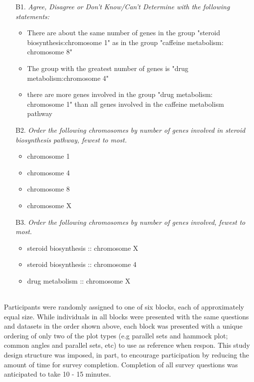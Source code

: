 \begin{itemize}
\item[B1.]\emph{Agree, Disagree or Don't Know/Can't Determine with the following statements:}
\begin{itemize}
\item There are about the same number of genes in the group "steroid biosynthesis:chromosome 1" as in the group "caffeine metabolism: chromosome 8"
\item The group with the greatest number of genes is "drug metabolism:chromosome 4"
\item there are more genes involved in the group "drug metabolism: chromosome 1" than all genes involved in the caffeine metabolism pathway
\end{itemize}

\item[B2.]\emph{Order the following chromosomes by number of genes involved in steroid biosynthesis pathway, fewest to most.}
\begin{itemize}
\item chromosome 1
\item chromosome 4
\item chromosome 8 
\item chromosome X
\end{itemize}

\item[B3.]\emph{Order the following chromosomes by number of genes involved, fewest to most.}
\begin{itemize}
\item steroid biosynthesis :: chromosome X
\item steroid biosynthesis :: chromosome 4
\item drug metabolism :: chromosome X
\end{itemize} 
\end{itemize} 

\noindent \\Participants were randomly assigned to one of six blocks, each of approximately equal size. While individuals in all blocks were presented with the same questions and datasets in the order shown above, each block was presented with a unique ordering of only two of the plot types (e.g parallel sets and hammock plot; common angles and parallel sets, etc) to use as reference when respon. This study design structure was imposed, in part,  to encourage participation by reducing the amount of time for survey completion. Completion of all survey questions was anticipated to take 10 - 15 minutes.


